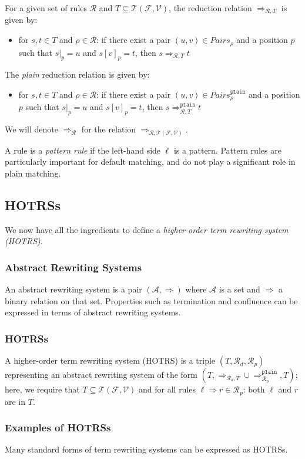 \documentclass{lmcs}
\theoremstyle{theorem}\newtheorem{theorem}{Theorem}
\theoremstyle{theorem}\newtheorem{lemma}[theorem]{Lemma}
\theoremstyle{theorem}\newtheorem{corollary}[theorem]{Corollary}
\theoremstyle{definition}\newtheorem{definition}[theorem]{Definition}
\theoremstyle{definition}\newtheorem{example}[theorem]{Example}
\newcommand{\F}{\mathcal{F}}
\newcommand{\V}{\mathcal{V}}
\newcommand{\Terms}{\mathcal{T}}
\newcommand{\Rules}{\mathcal{R}}
\newcommand{\arrz}{\Rightarrow}
\newcommand{\arr}[1]{\arrz_{#1}}
\newcommand{\mysubsection}[1]{\vspace{-12pt}\subsubsection{#1}}
\begin{document}
For a given set of rules $\Rules$ and $T \subseteq \Terms(\F,\V)$, the reduction relation
$\arr{\Rules,T}$ is given by:
\begin{itemize}
\item for $s,t \in T$ and $\rho \in \Rules$: if there exist a pair $(u,v) \in
  \mathit{Pairs}_{\rho}$ and a position $p$ such that
  $s|_p = u$ and $s[v]_p = t$, then $s \arr{\Rules,T} t$
\end{itemize}
The \emph{plain} reduction relation is given by:
\begin{itemize}
\item for $s,t \in T$ and $\rho \in \Rules$: if there exist a pair $(u,v) \in
  \mathit{Pairs}_{\rho}^{\mathtt{plain}}$ and a position $p$ such that
  $s|_p = u$ and $s[v]_p = t$, then $s \arr{\Rules,T}^{\mathtt{plain}} t$
\end{itemize}

\medskip
We will denote $\arr{\Rules}$ for the relation $\arr{\Rules,\Terms(\F,\V)}$.

A rule is a \emph{pattern rule} if the left-hand side $\ell$ is a pattern. Pattern rules are
particularly important for default matching, and do not play a significant role in plain matching.

\subsection{HOTRSs}

We now have all the ingredients to define a \emph{higher-order term rewriting system (HOTRS)}.

\mysubsection{Abstract Rewriting Systems}

An abstract rewriting system is a pair $(\mathcal{A},\arrz)$ where $\mathcal{A}$ is a set and
$\arrz$ a binary relation on that set.  Properties such as termination and confluence can be
expressed in terms of abstract rewriting systems.

\mysubsection{HOTRSs}

A higher-order term rewriting system (HOTRS) is a triple $(T,\Rules_d,\Rules_p)$ representing
an abstract rewriting system of the form $(T,\arr{\Rules_d,T} \cup
\arr{\Rules_p}^{\mathtt{plain}},T)$; here, we require that $T \subseteq \Terms(\F,\V)$ and for
all rules $\ell \arrz r \in \Rules_p$: both $\ell$ and $r$ are in $T$.

\mysubsection{Examples of HOTRSs}
Many standard forms of term rewriting systems can be expressed as HOTRSs.
\end{document}
